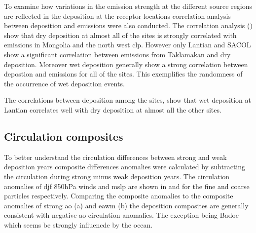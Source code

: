 To examine how variations in the emission strength at the different source regions are reflected in the deposition at the receptor locations correlation analysis between deposition and emissions were also conducted. The correlation analysis () show that dry deposition at almost all of the sites is strongly correlated with emissions in Mongolia and the north west \acrshort{clp}. However only Lantian and SACOL show a significant correlation between emissions from Taklamakan and dry deposition. Moreover wet deposition generally show a strong correlation between depostion and emissions for all of the sites. This exemplifies the randomness of the occurrence of wet deposition events. 

The correlations between deposition among the sites, show that wet deposition at Lantian correlates well with dry deposition at almost all the other sites. 

\subsection{Circulation composites}

To better understand the circulation differences between strong and weak deposition years composite differences anomalies were calculated by subtracting the circulation during strong minus weak deposition years. The circulation anomalies of \acrshort{djf} 850hPa winds and \acrshort{mslp} are shown in  and  for the fine and coarse particles respectively. Comparing the composite anomalies to the composite anomalies of strong \acrshort{ao} (a) and \acrshort{eawm} (b) the deposition composites are generally consistent with negative ao circulation anomalies. The exception being Badoe which seems be strongly influencde by the ocean. 


